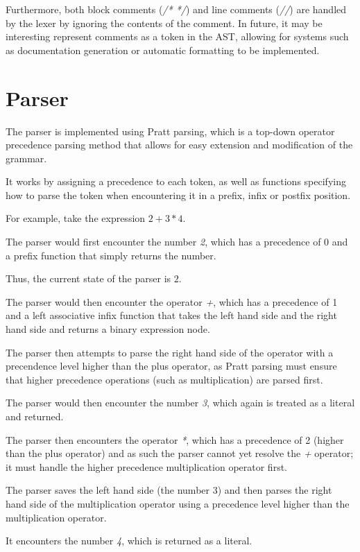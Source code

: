 Furthermore, both block comments (\textit{/* */}) and line comments (\textit{//}) are handled by the lexer by ignoring
the contents of the comment.
In future, it may be interesting represent comments as a token in the AST, allowing for systems such as documentation
generation or automatic formatting to be implemented.

\section{Parser}\label{sec:parser}

The parser is implemented using Pratt parsing\citep{pratt1973top}, which is a top-down operator precedence parsing 
method that allows for easy extension and modification of the grammar.

It works by assigning a precedence to each token, as well as functions specifying how to parse the token when 
encountering it in a prefix, infix or postfix position.

For example, take the expression $2 + 3 * 4$.

The parser would first encounter the number \textit{2}, which has a precedence of 0 and a prefix function that
simply returns the number.

Thus, the current state of the parser is $2$.

The parser would then encounter the operator \textit{+}, which has a precedence of 1 and a left associative infix
function that takes the left hand side and the right hand side and returns a binary expression node.

The parser then attempts to parse the right hand side of the operator with a precendence level higher than the
plus operator, as Pratt parsing must ensure that higher precedence operations (such as multiplication) are parsed
first.

The parser would then encounter the number \textit{3}, which again is treated as a literal and returned.

The parser then encounters the operator \textit{*}, which has a precedence of 2 (higher than the plus operator) and 
as such the parser cannot yet resolve the \textit{+} operator; it must handle the higher precedence multiplication
operator first.

The parser saves the left hand side (the number 3) and then parses the right hand side of the multiplication 
operator using a precedence level higher than the multiplication operator.

It encounters the number \textit{4}, which is returned as a literal.

